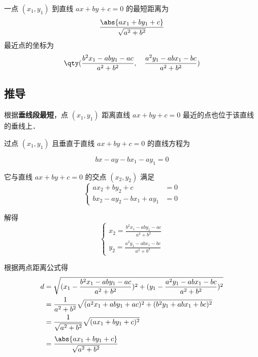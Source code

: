 
\begin{issues}
\issueDraft
\end{issues}

一点 $(x_1,y_1)$ 到直线 $ax + by + c = 0$ 的最短距离为
\begin{equation}
\frac{\abs{ax_1 + by_1 + c}}{\sqrt{a^2 + b^2}}
\end{equation}
最近点的坐标为
\begin{equation}
\qty(
\frac{b^2x_1 - aby_1 - ac}{a^2 + b^2}, \quad
\frac{a^2y_1 - abx_1 - bc}{a^2 + b^2})
\end{equation}

\subsection{推导}

根据\textbf{垂线段最短}，点 $(x_1, y_1)$ 距离直线 $ax + by + c = 0$ 最近的点也位于该直线的垂线上．

过点 $(x_1, y_1)$ 且垂直于直线 $ax+by+c=0$ 的直线方程为

\begin{equation}
bx - ay - bx_1 - ay_1 = 0
\end{equation}

它与直线 $ax + by + c = 0$ 的交点 $(x_2, y_2)$ 满足
\begin{equation}
\left\lbrace
\begin{aligned}
ax_2 + by_2 + c &= 0\\
bx_2 - ay_2-bx_1 + ay_1 &= 0
\end{aligned}
\right.
\end{equation}

解得
\begin{equation}
\left\lbrace
\begin{aligned}
x_2=\frac{b^2x_1 - aby_1 - ac}{a^2 + b^2}\\
y_2=\frac{a^2y_1 - abx_1 - bc}{a^2 + b^2}
\end{aligned}
\right.
\end{equation}

根据两点距离公式得
\begin{equation}
\begin{split}
d&=\sqrt{(x_1-\frac{b^2x_1 - aby_1 - ac}{a^2 + b^2})^2 + (y_1-\frac{a^2y_1 - abx_1 - bc}{a^2 + b^2})^2}\\
&=\frac{1}{a^2 + b^2}\sqrt{(a^2x_1 + aby_1 + ac)^2 + (b^2y_1 + abx_1 + bc)^2}\\
&=\frac{1}{\sqrt{a^2 + b^2}}\sqrt{(ax_1 + by_1 + c)^2}\\[3pt]
&=\frac{\abs{ax_1 + by_1 + c}}{\sqrt{a^2 + b^2}}\\
\end{split}
\end{equation}

